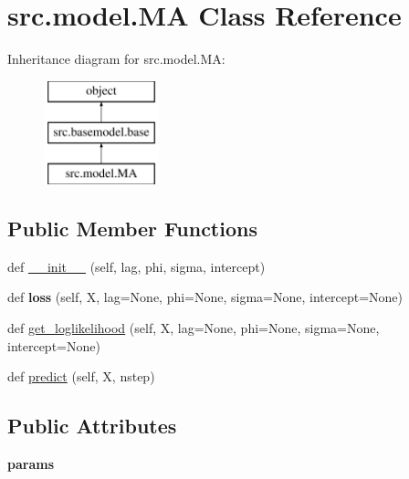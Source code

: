 \hypertarget{classsrc_1_1model_1_1MA}{}\section{src.\+model.\+MA Class Reference}
\label{classsrc_1_1model_1_1MA}
Inheritance diagram for src.\+model.\+MA\+:\begin{figure}[H]
\begin{center}
\leavevmode
\includegraphics[height=3.000000cm]{classsrc_1_1model_1_1MA}
\end{center}
\end{figure}
\subsection*{Public Member Functions}
\begin{DoxyCompactItemize}
\item 
def \hyperlink{classsrc_1_1model_1_1MA_a6a4df2f2b129069362819f597a1fc672}{\+\_\+\+\_\+init\+\_\+\+\_\+} (self, lag, phi, sigma, intercept)
\item 
\mbox{\label{classsrc_1_1model_1_1MA_a928e833a902d658a3f6b8ffe1cea02ee}} 
def {\bfseries loss} (self, X, lag=None, phi=None, sigma=None, intercept=None)
\item 
def \hyperlink{classsrc_1_1model_1_1MA_ac4f9c0e95e6a26447797a9e82144311c}{get\+\_\+loglikelihood} (self, X, lag=None, phi=None, sigma=None, intercept=None)
\item 
def \hyperlink{classsrc_1_1model_1_1MA_af0d3f5582d13a5b653b7b3ca5a5c2c68}{predict} (self, X, nstep)
\end{DoxyCompactItemize}
\subsection*{Public Attributes}
\begin{DoxyCompactItemize}
\item 
\mbox{\label{classsrc_1_1model_1_1MA_ad68f02ab2e17d6c9e2c7ab74403d87ac}} 
{\bfseries params}
\end{DoxyCompactItemize}


